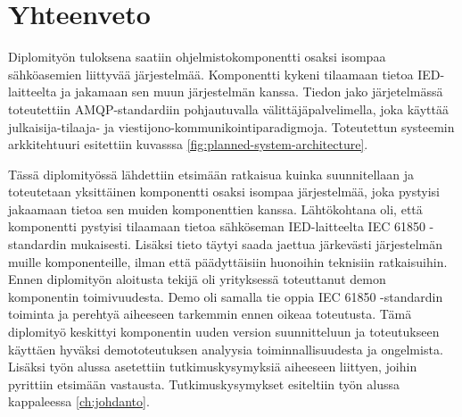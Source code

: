 \chapter{Yhteenveto}
\label{ch:yhteenveto}
Diplomityön tuloksena saatiin ohjelmistokomponentti osaksi isompaa sähköasemien liittyvää järjestelmää. Komponentti kykeni tilaamaan tietoa IED-laitteelta ja jakamaan sen muun järjestelmän kanssa. Tiedon jako järjetelmässä toteutettiin AMQP-standardiin pohjautuvalla välittäjäpalvelimella, joka käyttää julkaisija-tilaaja- ja viestijono-kommunikointiparadigmoja. Toteutettun systeemin arkkitehtuuri esitettiin kuvasssa \ref{fig:planned-system-architecture}.


Tässä diplomityössä lähdettiin etsimään ratkaisua kuinka suunnitellaan ja toteutetaan yksittäinen komponentti osaksi isompaa järjestelmää, joka pystyisi jakaamaan tietoa sen muiden komponenttien kanssa. Lähtökohtana oli, että komponentti pystyisi tilaamaan tietoa sähköseman IED-laitteelta IEC 61850 -standardin mukaisesti. Lisäksi tieto täytyi saada jaettua järkevästi järjestelmän muille komponenteille, ilman että päädyttäisiin huonoihin teknisiin ratkaisuihin. Ennen diplomityön aloitusta tekijä oli yrityksessä toteuttanut demon komponentin toimivuudesta. Demo oli samalla tie oppia IEC 61850 -standardin toiminta ja perehtyä aiheeseen tarkemmin ennen oikeaa toteutusta. Tämä diplomityö keskittyi komponentin uuden version suunnitteluun ja toteutukseen käyttäen hyväksi demototeutuksen analyysia toiminnallisuudesta ja ongelmista. Lisäksi työn alussa asetettiin tutkimuskysymyksiä aiheeseen liittyen, joihin pyrittiin etsimään vastausta. Tutkimuskysymykset esiteltiin työn alussa kappaleessa \ref{ch:johdanto}.

